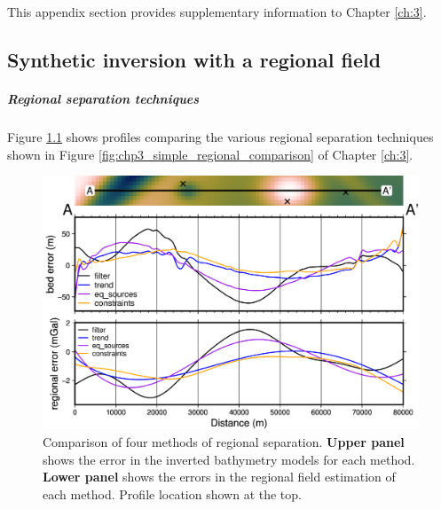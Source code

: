 \clearpage

 
 




\chapter{} \label{appendix:B}
This appendix section provides supplementary information to Chapter \ref{ch:3}. 

\section{Synthetic inversion with a regional field} \label{appendix:B:simple_regional_inversion}

\paragraph*{Regional separation techniques}

Figure \ref{fig:appB_simple_regional_comparison_profile} shows profiles comparing the various regional separation techniques shown in Figure \ref{fig:chp3_simple_regional_comparison} of Chapter \ref{ch:3}.

\begin{figure}[!ht]
    \centering
    \includegraphics[width=.95\textwidth]{figures/chp3/chp3_simple_regional_comparison_profiles.png}
    \caption[Comparison of four methods of regional separation]{Comparison of four methods of regional separation. \textbf{Upper panel} shows the error in the inverted bathymetry models for each method. \textbf{Lower panel} shows the errors in the regional field estimation of each method. Profile location shown at the top.}
    \label{fig:appB_simple_regional_comparison_profile}
\end{figure}

